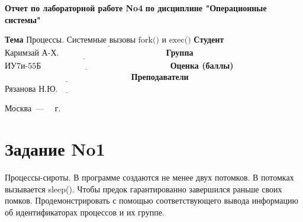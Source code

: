 \documentclass[12pt]{report}
\begin{document}
\begin{titlepage}
	
	\begin{center}
		\noindent\begin{minipage}{1.3\textwidth}\centering
			\Large\textbf{  Отчет по лабораторной работе No4}\newline
			\textbf{по дисциплине "Операционные системы"}\newline\newline
		\end{minipage}
	\end{center}
	
	\noindent\textbf{Тема} $\underline{\text{Процессы. Системные вызовы fork() и exec()}}$\newline\newline
	\noindent\textbf{Студент} $\underline{\text{Каримзай А-Х.~~~~~~~~~~~~~~~~~~~~~~~~~~~~~~~~~~~~~~}}$\newline\newline
	\noindent\textbf{Группа} $\underline{\text{ИУ7и-55Б~~~~~~~~~~~~~~~~~~~~~~~~~~~~~~~~~~~~~~~~~~~~~~}}$\newline\newline
	\noindent\textbf{Оценка (баллы)} $\underline{\text{~~~~~~~~~~~~~~~~~~~~~~~~~~~~~~~~~~~~~~~~~~~~~}}$\newline\newline
	\noindent\textbf{Преподаватели} $\underline{\text{Рязанова Н.Ю.~~~~~~~~~~~~~~~~~~~~~~~~~~}}$\newline\newline\newline
	
	\begin{center}
		\vfill
		Москва~---~\the\year
		~г.
	\end{center}
\end{titlepage}

\newpage

\section*{Задание No1}

Процессы-сироты. В программе создаются не менее двух потомков. В потомках вызывается sleep(). Чтобы предок гарантированно завершился раньше своих помков. Продемонстрировать с помощью соответствующего вывода информацию об идентификаторах процессов и их группе.
\end{document}
